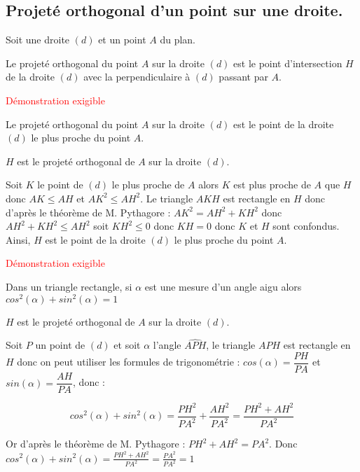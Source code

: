 \begin{pageCours} %


\section{Projeté orthogonal d'un point sur une droite.}

\begin{Def}
Soit une droite $(d)$ et un point $A$ du plan.

Le projeté orthogonal du point $A$ sur la droite $(d)$ est le point d'intersection $H$ de la droite $(d)$ avec la perpendiculaire à $(d)$ passant par $A$.
\end{Def}

\begin{Pp}
\textcolor{red}{Démonstration exigible}

Le projeté orthogonal du point $A$ sur la droite $(d)$ est le point de la droite $(d)$ le plus proche du point $A$.
\end{Pp}

\begin{Pv}
$H$ est le projeté orthogonal de $A$ sur la droite $(d)$.

Soit $K$ le point de $(d)$ le plus proche de $A$ alors $K$ est plus proche de $A$ que $H$ donc $AK\leq AH$ et $AK^2\leq AH^2$. Le triangle $AKH$ est rectangle en $H$ donc d'après le théorème de M. Pythagore : $AK^2=AH^2+KH^2$ donc $AH^2+KH^2\leq AH^2$ soit $KH^2\leq 0$ donc $KH=0$ donc $K$ et $H$ sont confondus. Ainsi, $H$ est le point de la droite $(d)$ le plus proche du point $A$.
\end{Pv}

\begin{Pp}
\textcolor{red}{Démonstration exigible}

Dans un triangle rectangle, si $\alpha$ est une mesure d'un angle aigu alors $cos^2(\alpha)+sin^2(\alpha)=1$
\end{Pp}

\begin{Pv}
$H$ est le projeté orthogonal de $A$ sur la droite $(d)$.

Soit $P$ un point de $(d)$ et soit $\alpha$ l'angle $\widehat{APH}$, le triangle $APH$ est rectangle en $H$ donc on peut utiliser les formules de trigonométrie :
$cos(\alpha)=\dfrac{PH}{PA}$ et $sin(\alpha)=\dfrac{AH}{PA}$, donc : 

\[cos^2(\alpha)+sin^2(\alpha)=\frac{PH^2}{PA^2}+\frac{AH^2}{PA^2}=\frac{PH^2+AH^2}{PA^2}\]

Or d'après le théorème de M. Pythagore : $PH^2+AH^2=PA^2$. Donc $cos^2(\alpha)+sin^2(\alpha)=\frac{PH^2+AH^2}{PA^2}=\frac{PA^2}{PA^2}=1$
\end{Pv}

\end{pageCours} %

